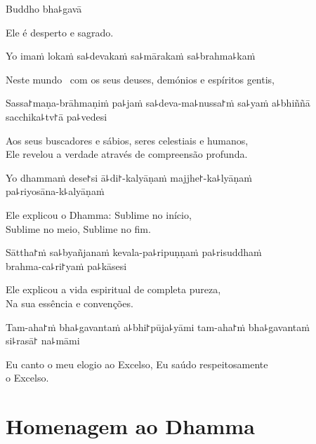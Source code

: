 Buddho bha꜕gavā

\begin{english}
  Ele é desperto e sagrado.
\end{english}

Yo imaṁ lokaṁ sa꜕devakaṁ sa꜕mārakaṁ sa꜕brahma꜕kaṁ

\begin{english}
  Neste mundo \pause\ com os seus deuses, demónios e espíritos gentis,
\end{english}

Sassa꜓maṇa-brāhmaṇiṁ pa꜕jaṁ sa꜕deva-ma꜕nussa꜓ṁ sa꜕yaṁ a꜕bhiññā sacchika꜕tv꜓ā pa꜕vedesi

\begin{english}
  Aos seus buscadores e sábios, seres celestiais e humanos,\\ Ele revelou a verdade através de compreensão profunda.
\end{english}

Yo dhammaṁ dese꜓si ā꜕di꜓-kalyāṇaṁ majjhe꜓-ka꜕lyāṇaṁ \\pa꜕riyosāna-k꜕alyāṇaṁ

\begin{english}
  Ele explicou o Dhamma: Sublime no início,\\ Sublime no meio, Sublime no fim.
\end{english}

Sāttha꜓ṁ sa꜕byañjanaṁ kevala-pa꜕ripuṇṇaṁ pa꜕risuddhaṁ \\brahma-ca꜕ri꜓yaṁ pa꜕kāsesi

\begin{english}
  Ele explicou a vida espiritual de completa pureza,\\Na sua essência e convenções.
\end{english}

Tam-aha꜓ṁ bha꜕gavantaṁ a꜕bhi꜓pūja꜕yāmi tam-aha꜓ṁ bha꜕gavantaṁ \\si꜕rasā꜓ na꜕māmi

\begin{english}
  Eu canto o meu elogio ao Excelso, Eu saúdo respeitosamente \\o Excelso.
\end{english}

\clearpage

\chapter{Homenagem ao Dhamma}

\begin{leader}
\end{leader}

